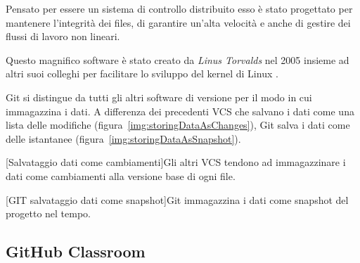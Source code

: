 			Pensato per essere un sistema di controllo distribuito esso è stato progettato per mantenere l'integrità dei files, di garantire un'alta velocità e anche di gestire dei flussi di lavoro non lineari.
			
			Questo magnifico software è stato creato da \textit{Linus Torvalds} nel 2005 insieme ad altri suoi colleghi per facilitare lo sviluppo del kernel di Linux .
			
			Git si distingue da tutti gli altri software di versione per il modo in cui immagazzina i dati. A differenza dei precedenti VCS che salvano i dati come una lista delle modifiche (figura~\ref{img:storingDataAsChanges}), Git salva i dati come delle istantanee (figura~\ref{img:storingDataAsSnapshot}). 
			
			\begin{center}
				[Salvataggio dati come cambiamenti]{Gli altri VCS tendono ad immagazzinare i dati come cambiamenti alla versione base di ogni file.}
				\label{img:storingDataAsChanges}
			\end{center}
		
			\begin{center}
				[GIT salvataggio dati come snapshot]{Git immagazzina i dati come snapshot del progetto nel tempo.}\label{img:storingDataAsSnapshot}
			\end{center}

		\subsection{GitHub Classroom} 
	
	

	
